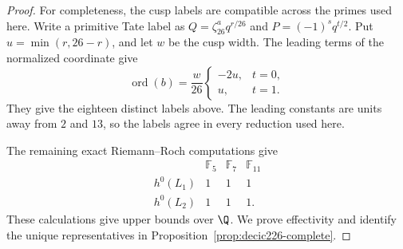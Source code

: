 \begin{proof}
For completeness, the cusp labels are compatible across the primes
used here. Write a primitive Tate label as
$Q=\zeta_{26}^a q^{r/26}$ and
$P=(-1)^s q^{t/2}$. Put $u=\min(r,26-r)$, and let $w$ be the cusp
width. The leading terms of the normalized coordinate give
\[
 \operatorname{ord}(b)=\frac{w}{26}
 \begin{cases}-2u,&t=0,\\u,&t=1.\end{cases}
\]
They give the eighteen distinct labels above. The leading constants
are units away from $2$ and $13$, so the labels agree in every
reduction used here.

The remaining exact Riemann--Roch computations give
\[
\begin{array}{c|ccc}
 &\mathbb F_5&\mathbb F_7&\mathbb F_{11}\\\hline
 h^0(L_1)&1&1&1\\
 h^0(L_2)&1&1&1.
\end{array}
\]
These calculations give upper bounds over $\Q$. We prove effectivity
and identify the unique representatives in
Proposition~\ref{prop:decic226-complete}.
\end{proof}
